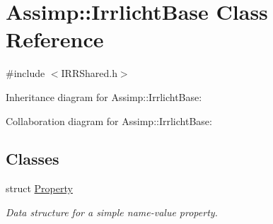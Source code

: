 \hypertarget{class_assimp_1_1_irrlicht_base}{\section{Assimp\+:\+:Irrlicht\+Base Class Reference}
\label{class_assimp_1_1_irrlicht_base}
}


{\ttfamily \#include $<$I\+R\+R\+Shared.\+h$>$}



Inheritance diagram for Assimp\+:\+:Irrlicht\+Base\+:


Collaboration diagram for Assimp\+:\+:Irrlicht\+Base\+:
\subsection*{Classes}
\begin{DoxyCompactItemize}
\item 
struct \hyperlink{struct_assimp_1_1_irrlicht_base_1_1_property}{Property}
\begin{DoxyCompactList}\small\item\em Data structure for a simple name-\/value property. \end{DoxyCompactList}\end{DoxyCompactItemize}
